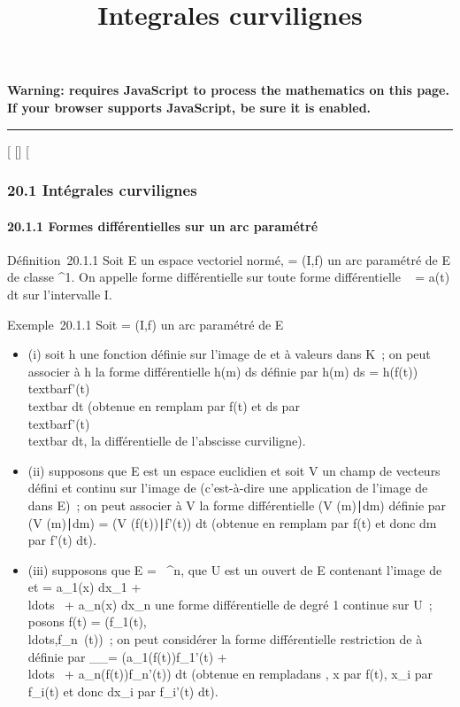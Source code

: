 \documentclass[]{article}
\title{Integrales curvilignes}
\author{}
\date{}
\begin{document}
\maketitle

\textbf{Warning: 
requires JavaScript to process the mathematics on this page.\\ If your
browser supports JavaScript, be sure it is enabled.}

\begin{center}\rule{3in}{0.4pt}\end{center}

{[}
{[}{]}
{[}

\subsubsection{20.1 Intégrales curvilignes}

\paragraph{20.1.1 Formes différentielles sur un arc paramétré}

Définition~20.1.1 Soit E un espace vectoriel normé, \Gamma = (I,f) un arc
paramétré de E de classe ^1. On appelle forme différentielle
sur \Gamma toute forme différentielle \alpha~ = a(t) dt sur l'intervalle I.

Exemple~20.1.1 Soit \Gamma = (I,f) un arc paramétré de E

\begin{itemize}
\itemsep1pt\parskip0pt
\item
  (i) soit h une fonction définie sur l'image de \Gamma et à valeurs dans K~;
  on peut associer à h la forme différentielle h(m) ds définie par h(m)
  ds = h(f(t)) \\textbar{}f'(t)\\textbar{}
  dt (obtenue en rempla\ccant m par f(t) et ds par
  \\textbar{}f'(t)\\textbar{} dt, la
  différentielle de l'abscisse curviligne).
\item
  (ii) supposons que E est un espace euclidien et soit V un champ de
  vecteurs défini et continu sur l'image de \Gamma (c'est-à-dire une
  application de l'image de \Gamma dans E)~; on peut associer à V la forme
  différentielle (V (m)∣dm) définie par (V
  (m)∣dm) = \left (V
  (f(t))∣f'(t)\right ) dt
  (obtenue en rempla\ccant m par f(t) et donc dm par
  f'(t) dt).
\item
  (iii) supposons que E = ~^n, que U est un ouvert de E
  contenant l'image de \Gamma et \omega = a\_1(x) dx\_1 +
  \\ldots~ +
  a\_n(x) dx\_n une forme différentielle de degré 1
  continue sur U~; posons f(t) =
  (f\_1(t),\\ldots,f\_n~(t))~;
  on peut considérer la forme différentielle restriction de \omega à \Gamma
  définie par \omega\_\textbar{}\_\Gamma = \left
  (a\_1(f(t))f\_1'(t) +
  \\ldots~ +
  a\_n(f(t))f\_n'(t)\right ) dt (obtenue
  en rempla\ccant dans \omega, x par f(t), x\_i
  par f\_i(t) et donc dx\_i par f\_i'(t) dt).
\end{itemize}
\end{document}
